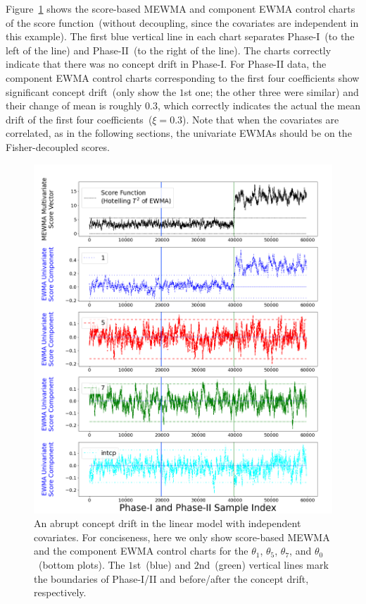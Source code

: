 \documentclass[twoside,11pt]{article}
\begin{document}
\begin{appendices}
Figure~\ref{fig:lin_reg_ind_X} shows the score-based MEWMA and component EWMA control charts of the score function~(without decoupling, since the covariates are independent in this example). The first blue vertical line in each chart separates Phase-I~(to the left of the line) and Phase-II~(to the right of the line). The charts correctly indicate that there was no concept drift in Phase-I. For Phase-II data, the component EWMA control charts corresponding to the first four coefficients show significant concept drift~(only show the $1$st one; the other three were similar) and their change of mean is roughly $0.3$, which correctly indicates the actual the mean drift of the first four coefficients~($\xi=0.3$). Note that when the covariates are correlated, as in the following sections, the univariate EWMAs should be on the Fisher-decoupled scores. 


\begin{figure}[!hpt]
\centering
  \includegraphics[width = 0.8\linewidth]{../figures/v14/sim_2/reg/neg_single_1_sim2_mlines_with_regu_1e-08_0_005.png}
  \caption{An abrupt concept drift in the linear model with independent covariates. For conciseness, here we only show score-based MEWMA and the component EWMA control charts for the $\theta_1$, $\theta_5$, $\theta_7$, and $\theta_0$~(bottom plots). The $1$st~(blue) and $2$nd~(green) vertical lines mark the boundaries of Phase-I/II and before/after the concept drift, respectively.}
  \label{fig:lin_reg_ind_X}
\end{figure}


\end{appendices}
\end{document}
